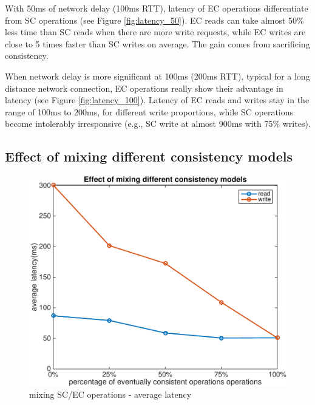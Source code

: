 With 50ms of network delay (100ms RTT), latency of EC operations differentiate from SC operations  (see Figure \ref{fig:latency_50}). EC reads can take almost 50\% less time than SC reads when there are more write requests, while EC writes are close to 5 times faster than SC writes on average. The gain comes from sacrificing consistency.

When network delay is more significant at 100ms (200ms RTT), typical for a long distance network connection, EC operations really show their advantage in latency  (see Figure \ref{fig:latency_100}). Latency of EC reads and writes stay in the range of 100ms to 200ms, for different write proportions, while SC operations become intolerably irresponsive (e.g., SC write at almost 900ms with 75\% writes).

\subsection{Effect of mixing different consistency models}
\vspace{-2mm}
\begin{figure}[h]
\centering
\includegraphics[width=0.95\linewidth]{figures/mix.pdf}
\caption{mixing SC/EC operations - average latency}
\label{fig:mix}
\end{figure}
\vspace{-5mm}

